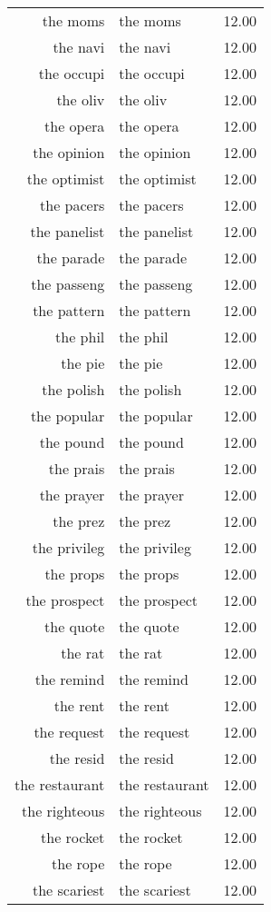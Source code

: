 \begin{table}[ht]
\begin{tabular}{rlr}
  the moms & the moms & 12.00 \\ 
  the navi & the navi & 12.00 \\ 
  the occupi & the occupi & 12.00 \\ 
  the oliv & the oliv & 12.00 \\ 
  the opera & the opera & 12.00 \\ 
  the opinion & the opinion & 12.00 \\ 
  the optimist & the optimist & 12.00 \\ 
  the pacers & the pacers & 12.00 \\ 
  the panelist & the panelist & 12.00 \\ 
  the parade & the parade & 12.00 \\ 
  the passeng & the passeng & 12.00 \\ 
  the pattern & the pattern & 12.00 \\ 
  the phil & the phil & 12.00 \\ 
  the pie & the pie & 12.00 \\ 
  the polish & the polish & 12.00 \\ 
  the popular & the popular & 12.00 \\ 
  the pound & the pound & 12.00 \\ 
  the prais & the prais & 12.00 \\ 
  the prayer & the prayer & 12.00 \\ 
  the prez & the prez & 12.00 \\ 
  the privileg & the privileg & 12.00 \\ 
  the props & the props & 12.00 \\ 
  the prospect & the prospect & 12.00 \\ 
  the quote & the quote & 12.00 \\ 
  the rat & the rat & 12.00 \\ 
  the remind & the remind & 12.00 \\ 
  the rent & the rent & 12.00 \\ 
  the request & the request & 12.00 \\ 
  the resid & the resid & 12.00 \\ 
  the restaurant & the restaurant & 12.00 \\ 
  the righteous & the righteous & 12.00 \\ 
  the rocket & the rocket & 12.00 \\ 
  the rope & the rope & 12.00 \\ 
  the scariest & the scariest & 12.00 \\ 

\end{tabular}
\end{table}
